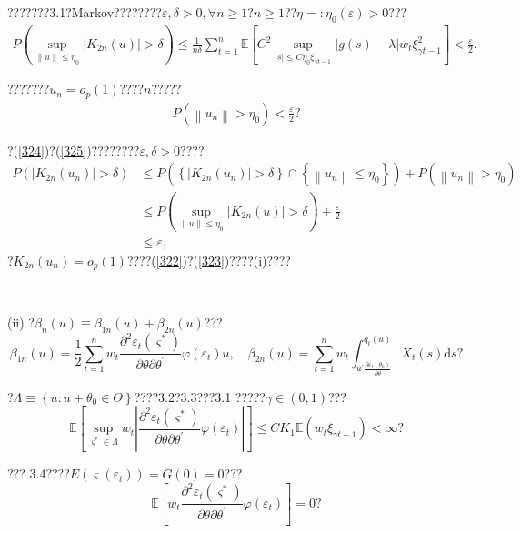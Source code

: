 \documentclass[a4paper,12pt,openany,oneside,utf-8]{ctexbook}
\begin{document}
	\noindent ???????3.1?Markov????????$\varepsilon,\delta>0,\forall n\ge 1$?$n\ge 1$??$\eta=:\eta_0(\varepsilon)>0$???
	\begin{align}\label{324}
		P\left(\sup _{\|u\| \leq \eta_{0}}\left|K_{2 n}(u)\right|>\delta\right) \le \frac{1}{n\delta}\sum_{t=1}^n\mathbb{E}\left[C^2\sup_{|s| \leq C \eta_0 \xi_{\gamma t-1}}|g(s)-\lambda| w_{t} \xi_{\gamma t-1}^{2}\right]<\frac{\varepsilon}{2}.
	\end{align}
	
	???????$u_n=o_p(1)$????$n$?????
	\begin{align}\label{325}
		P\left(\left\|u_{n}\right\|>\eta_{0}\right)< \frac{\varepsilon}{2}\mbox{?}
	\end{align}
	
	\noindent ?(\ref{324})?(\ref{325})????????$\varepsilon,\delta>0$????
	\begin{align}
		P\left(\left|K_{2 n}\left(u_{n}\right)\right|>\delta\right) &\leq P\left(\left\{\left|K_{2 n}\left(u_{n}\right)\right|>\delta\right\} \cap\left\{\left\|u_{n}\right\| \le \eta_{0}\right\}\right)+P\left(\left\|u_{n}\right\|>\eta_{0}\right)\nonumber\\
		&\leq P\left(\sup _{\|u\| \leq \eta_{0}}\left|K_{2 n}(u)\right|>\delta\right)+\frac{\varepsilon}{2}\nonumber\\
		&\le \varepsilon,\nonumber
	\end{align}
	?$K_{2 n}\left(u_{n}\right)=o_{p}(1)$????(\ref{322})?(\ref{323})????(i)????
	
	\
	
	\noindent (ii) ?$\beta_{n}(u) \equiv \beta_{1 n}(u)+\beta_{2 n}(u)$???
	$$\beta_{1 n}(u)=\frac{1}{2}\sum_{t=1}^nw_t\frac{\partial^2\varepsilon_t(\varsigma^\ast)}{\partial\theta\partial\theta^{\prime}}\varphi(\varepsilon_t)u,\quad \beta_{2 n}(u)=\sum_{t=1}^nw_t\int_{u^{\prime}\frac{\partial\varepsilon_t(\theta_0)}{\partial\theta}}^{q_t(u)}X_t(s)\mathrm{d}s\mbox{?}$$
	
	\noindent ?$\Lambda\equiv\left\{u:u+\theta_0\in\Theta\right\}$????3.2?3.3???3.1 ?????$\gamma\in(0,1)$???
	$$
	\mathbb{E}\left[\sup _{\varsigma^{*} \in \Lambda} w_{t}\left|\frac{\partial^{2} \varepsilon_{t}\left(\varsigma^{*}\right)}{\partial \theta \partial \theta^{\prime}}\varphi(\varepsilon_t)\right|\right] \leq C K_1\mathbb{E}\left(w_{t} \xi_{\gamma t-1}\right)<\infty\mbox{?}
	$$
	
	\noindent ??? 3.4????$E(\varsigma(\varepsilon_t))=G(0)=0$???
	$$\mathbb{E}\left[w_{t}\frac{\partial^{2} \varepsilon_{t}\left(\varsigma^{*}\right)}{\partial \theta \partial \theta^{\prime}}\varphi(\varepsilon_t)\right]=0\mbox{?}$$
	
\end{document}
